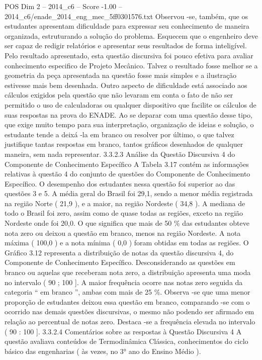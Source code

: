 \begin{textsample}{POS Dim 2 – 2014\_c6 – Score -1.00 – 2014\_c6/enade\_2014\_eng\_mec\_5ff0301576.txt}
Observou -se, também, que os estudantes apresentam dificuldade para expressar seu conhecimento de maneira organizada, estruturando a solução do problema.
Esquecem que o engenheiro deve ser capaz de redigir relatórios e apresentar seus resultados de forma inteligível.
Pelo resultado apresentado, esta questão discursiva foi pouco efetiva para avaliar conhecimento especifico de Projeto Mecânico.
Talvez o resultado fosse melhor se a geometria da peça apresentada na questão fosse mais simples e a ilustração estivesse mais bem desenhada.
Outro aspecto de dificuldade está associado aos cálculos exigidos pela questão que não levaram em conta o fato de não ser permitido o uso de calculadoras ou qualquer dispositivo que facilite os cálculos de suas respostas na prova do ENADE.
Ao se deparar com uma questão desse tipo, que exige muito tempo para sua interpretação, organização de ideias e solução, o estudante tende a deixá -la em branco ou resolver por último, o que talvez justifique tantas respostas em branco, tantos gráficos desenhados de qualquer maneira, sem nada representar. 3.3.2.3 Análise da Questão Discursiva 4 do Componente de Conhecimento Específico A Tabela 3.17 contém as informações relativas à questão 4 do conjunto de questões do Componente de Conhecimento Específico.
O desempenho dos estudantes nessa questão foi superior ao das questões 3 e 5.
A média geral do Brasil foi 29,1, sendo a menor média registrada na região Norte ( 21,9 ), e a maior, na região Nordeste ( 34,8 ).
A mediana de todo o Brasil foi zero, assim como de quase todas as regiões, exceto na região Nordeste onde foi 20,0.
O que significa que mais de 50 \% das estudantes obteve nota zero ou deixou a questão em branco, menos na região Nordeste.
A nota máxima ( 100,0 ) e a nota mínima ( 0,0 ) foram obtidas em todas as regiões.
O Gráfico 3.12 representa a distribuição de notas da questão discursiva 4, do Componente de Conhecimento Específico.
Desconsiderando as questões em branco ou aquelas que receberam nota zero, a distribuição apresenta uma moda no intervalo ( 90 ; 100 ].
A maior frequência ocorre nas notas zero seguida da categoria “ em branco ”, ambas com mais de 25 \%.
Observa -se que uma menor proporção de estudantes deixou essa questão em branco, comparando -se com o ocorrido nas demais questões discursivas, o mesmo não podendo ser afirmado em relação ao percentual de notas zero.
Destaca -se a frequência elevada no intervalo ( 90 : 100 ]. 3.3.2.4 Comentários sobre as respostas à Questão Discursiva 4 A questão avaliava conteúdos de Termodinâmica Clássica, conhecimentos do ciclo básico das engenharias ( às vezes, no 3{\EmojiFont °} ano do Ensino Médio ).

\end{textsample}

